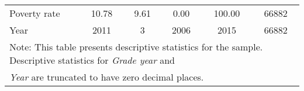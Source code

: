 \begin{table}[htbp]
\begin{tabular}{l*{1}{ccccc}}
\hspace{0.25cm} Poverty rate&       10.78&        9.61&        0.00&      100.00&       66882\\
\hspace{0.25cm} Year&        2011&           3&        2006&        2015&       66882\\
\bottomrule
\multicolumn{6}{l}{\footnotesize Note: This table presents descriptive statistics for the sample. Descriptive statistics for \emph{Grade year} and}\\
\multicolumn{6}{l}{\footnotesize \emph{Year} are truncated to have zero decimal places.}\\
\end{tabular}
\end{table}
